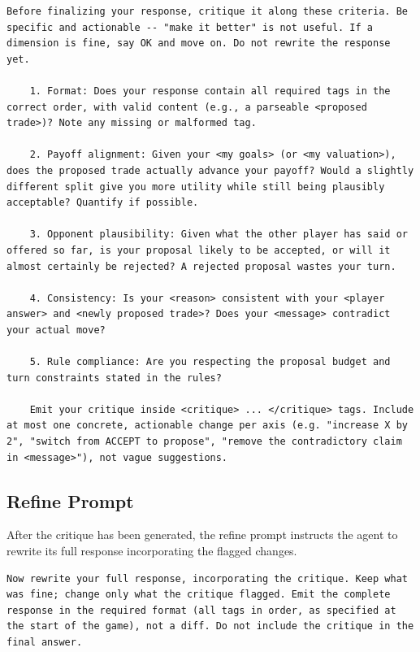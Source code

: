 \begin{lstlisting}[caption={Self-Refine feedback prompt.},label={lst:sr-feedback}]
    Before finalizing your response, critique it along these criteria. Be specific and actionable -- "make it better" is not useful. If a dimension is fine, say OK and move on. Do not rewrite the response yet.

    1. Format: Does your response contain all required tags in the correct order, with valid content (e.g., a parseable <proposed trade>)? Note any missing or malformed tag.

    2. Payoff alignment: Given your <my goals> (or <my valuation>), does the proposed trade actually advance your payoff? Would a slightly different split give you more utility while still being plausibly acceptable? Quantify if possible.

    3. Opponent plausibility: Given what the other player has said or offered so far, is your proposal likely to be accepted, or will it almost certainly be rejected? A rejected proposal wastes your turn.
   
    4. Consistency: Is your <reason> consistent with your <player answer> and <newly proposed trade>? Does your <message> contradict your actual move?
   
    5. Rule compliance: Are you respecting the proposal budget and turn constraints stated in the rules?

    Emit your critique inside <critique> ... </critique> tags. Include at most one concrete, actionable change per axis (e.g. "increase X by 2", "switch from ACCEPT to propose", "remove the contradictory claim in <message>"), not vague suggestions.
\end{lstlisting}

\subsection{Refine Prompt}

After the critique has been generated, the refine prompt instructs the agent to rewrite its full response incorporating the flagged changes.

\begin{lstlisting}[caption={Self-Refine refine prompt.},label={lst:sr-refine}]
    Now rewrite your full response, incorporating the critique. Keep what was fine; change only what the critique flagged. Emit the complete response in the required format (all tags in order, as specified at the start of the game), not a diff. Do not include the critique in the final answer.
\end{lstlisting}


